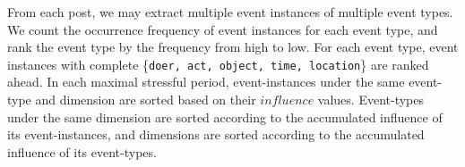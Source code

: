 From each post, we may extract multiple event instances of multiple event types.
We count the occurrence frequency of event instances for each event type,
and rank the event type by the frequency from high to low.
For each event type, event instances with complete \{\texttt{doer, act, object, time, location}\} are ranked ahead.
In each maximal stressful period, event-instances under the same event-type and dimension are sorted
based on their $influence$ values.
Event-types under the same dimension are sorted according to the accumulated influence of its event-instances,
and dimensions are sorted according to the accumulated influence of its event-types.















